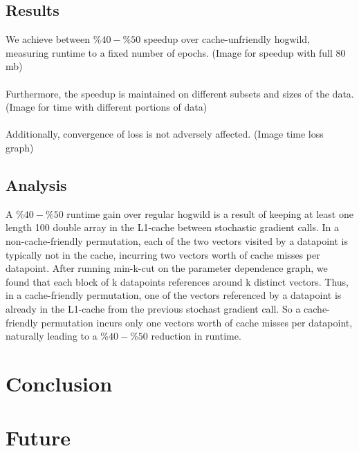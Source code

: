 \documentclass[paper=a4, fontsize=11pt]{scrartcl}
\numberwithin{equation}{section}		%
\numberwithin{figure}{section}			%
\numberwithin{table}{section}				%
\begin{document}
\subsection{Results}
We achieve between $\%40-\%50$ speedup over cache-unfriendly hogwild, measuring runtime to a fixed number of epochs.
(Image for speedup with full 80 mb)
\\\\
Furthermore, the speedup is maintained on different subsets and sizes of the data.
(Image for time with different portions of data)
\\\\
Additionally, convergence of loss is not adversely affected.
(Image time loss graph)

\subsection{Analysis}

A $\%40-\%50$ runtime gain over regular hogwild is a result of keeping
at least one length 100 double array in the L1-cache between
stochastic gradient calls. In a non-cache-friendly permutation, each
of the two vectors visited by a datapoint is typically not in the
cache, incurring two vectors worth of cache misses per
datapoint. After running min-k-cut on the parameter dependence graph,
we found that each block of k datapoints references around k distinct
vectors. Thus, in a cache-friendly permutation, one of the vectors
referenced by a datapoint is already in the L1-cache from the previous
stochast gradient call. So a cache-friendly permutation incurs only
one vectors worth of cache misses per datapoint, naturally leading to
a $\%40-\%50$ reduction in runtime.
\newpage
\section{Conclusion}
\newpage
\section{Future}
\end{document}
